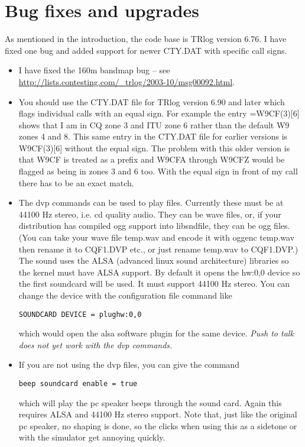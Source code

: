 \documentclass[12pt]{article}
\begin{document}
\section{Bug fixes and upgrades}
As mentioned in the introduction, the code base is TRlog version 6.76.
I have fixed one bug and added support for newer CTY.DAT with specific
call signs.
\begin{itemize}
\item
I have fixed the 160m bandmap bug -- see
\url{http://lists.contesting.com/_trlog/2003-10/msg00092.html}.
\item
You should use the CTY.DAT file for TRlog version 6.90 and later which
flags individual calls with an equal sign. For example the entry =W9CF(3)[6]
shows that I am in CQ zone 3 and ITU zone 6 rather than the default
W9 zones 4 and 8. This same entry in the
CTY.DAT file for earlier versions is W9CF(3)[6] without the equal sign. The
problem with this older version is that W9CF is treated as a prefix
and W9CFA through W9CFZ would be
flagged as being in zones 3 and 6 too. With the equal sign in front
of my call there has to be an exact match.
\item
The dvp commands can be used to play files. Currently
these must be at 44100 Hz stereo, i.e. cd quality audio. They can
be wave files, or, if your distribution has compiled ogg support
into libsndfile, they can be ogg files. (You can take your
wave file temp.wav and encode it with oggenc temp.wav then rename
it to CQF1.DVP etc., or just rename temp.wav to CQF1.DVP.) The sound
uses the ALSA (advanced linux sound architecture) libraries so
the kernel must have ALSA support. By default it opens the hw:0,0 device
so the first soundcard will be used. It must support 44100 Hz stereo.
You can change the device with the configuration file command like
\begin{verbatim}
SOUNDCARD DEVICE = plughw:0,0
\end{verbatim}
which would open the alsa software plugin for the same device.
{\em Push to talk does not yet work with the dvp commands.}
\item
If you are not using the dvp files, you can give the command
\begin{verbatim}
beep soundcard enable = true
\end{verbatim}
which will play the pc speaker beeps through the sound card.
Again this requires ALSA and 44100 Hz stereo support.
Note that, just like the original pc speaker,
no shaping is done, so the clicks when using this as a sidetone or 
with the simulator get annoying quickly.


\end{itemize}
\end{document}
